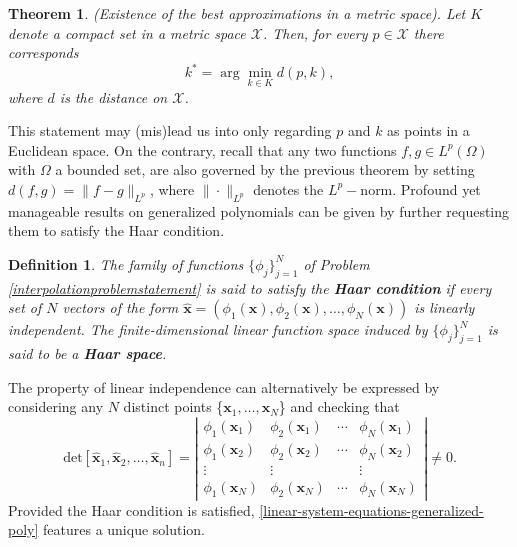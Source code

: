 \documentclass[12pt]{report} %
\newtheorem{definition}{Definition}
\newtheorem{theorem}{Theorem}
\newcommand{\tmmathbf}[1]{\ensuremath{\boldsymbol{#1}}}
\newcommand{\tmstrong}[1]{\textbf{#1}}
\begin{document}
\begin{theorem}
  (Existence of the best approximations in a metric space). Let $K$ denote a
  compact set in a metric space $\mathcal{X}$. Then, for every $p \in
    \mathcal{X}$ there corresponds
  \[ k^{\ast} = \arg \min_{k \in K} d (p, k), \]
  where $d$ is the distance on $\mathcal{X}$.
\end{theorem}

This statement may (mis)lead us into only regarding $p$ and $k$ as points in
a Euclidean space. On the contrary, recall that any two functions $f, g \in
  L^p (\Omega)$ with $\Omega$ a bounded set, are also governed by the previous
theorem by setting $d (f, g) = \| f - g \|_{L^p}$, where $\| \cdot \|_{L^p}$
denotes the $L^p -$norm. Profound yet manageable results on generalized
polynomials can be given by further requesting them to satisfy the Haar
condition.

\begin{definition}
  The family of functions $\{ \phi_j \}_{j = 1}^N$ of Problem
  \ref{interpolationproblemstatement} is said to satisfy the {\tmstrong{Haar
        condition}} if every set of $N$ vectors of the form $\hat{\tmmathbf{x}} =
    (\phi_1 (\tmmathbf{x}), \phi_2 (\tmmathbf{x}), \ldots, \phi_N
    (\tmmathbf{x}))$ is linearly independent. The finite-dimensional linear function space induced by $\{ \phi_j \}_{j = 1}^N$ is said to be a {\tmstrong{Haar
        space}}.
\end{definition}

The property of linear independence can alternatively be expressed by
considering any $N$ distinct points  \{$\tmmathbf{x}_1, \ldots,
  \tmmathbf{x}_N$\}  and checking that
\[ \text{det}  [\hat{\tmmathbf{x}}_1, \hat{\tmmathbf{x}}_2, \ldots,
    \hat{\tmmathbf{x}}_n] = \left|\begin{array}{cccc}
    \phi_1 (\tmmathbf{x}_1) & \phi_2 (\tmmathbf{x}_1) & \cdots & \phi_N
    (\tmmathbf{x}_1)                                                    \\
    \phi_1 (\tmmathbf{x}_2) & \phi_2 (\tmmathbf{x}_2) & \cdots & \phi_N
    (\tmmathbf{x}_2)                                                    \\
    \vdots                  & \vdots                  &        & \vdots \\
    \phi_1 (\tmmathbf{x}_N) & \phi_2 (\tmmathbf{x}_N) & \cdots & \phi_N
    (\tmmathbf{x}_N)
  \end{array}\right| \neq 0. \]
Provided the Haar condition is satisfied,
\eqref{linear-system-equations-generalized-poly} features a unique solution.
\end{document}
